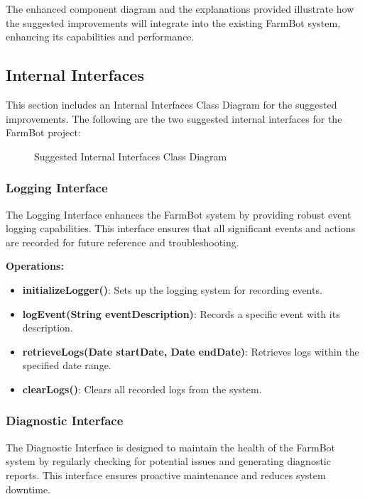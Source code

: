 The enhanced component diagram and the explanations provided illustrate how the suggested improvements will integrate into the existing FarmBot system, enhancing its capabilities and performance.



\subsection{Internal Interfaces}

This section includes an Internal Interfaces Class Diagram for the suggested improvements. The following are the two suggested internal interfaces for the FarmBot project:

\begin{figure}[H]
    \centering
    
    \caption{Suggested Internal Interfaces Class Diagram}
\end{figure}

\subsubsection{Logging Interface}

The Logging Interface enhances the FarmBot system by providing robust event logging capabilities. This interface ensures that all significant events and actions are recorded for future reference and troubleshooting.

\textbf{Operations:}
\begin{itemize}
    \item \textbf{initializeLogger()}: Sets up the logging system for recording events.
    \item \textbf{logEvent(String eventDescription)}: Records a specific event with its description.
    \item \textbf{retrieveLogs(Date startDate, Date endDate)}: Retrieves logs within the specified date range.
    \item \textbf{clearLogs()}: Clears all recorded logs from the system.
\end{itemize}

\subsubsection{Diagnostic Interface}

The Diagnostic Interface is designed to maintain the health of the FarmBot system by regularly checking for potential issues and generating diagnostic reports. This interface ensures proactive maintenance and reduces system downtime.

